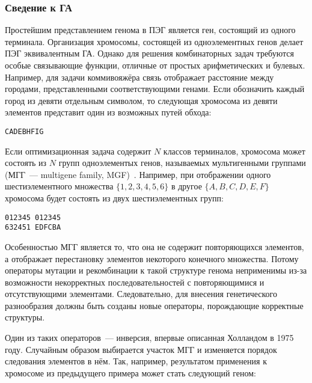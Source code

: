 
\subsubsection{Сведение к ГА}

Простейшим представлением генома в ПЭГ является ген, состоящий из одного терминала. Организация хромосомы, состоящей из одноэлементных генов делает ПЭГ эквивалентным ГА. Однако для решения комбинаторных задач требуются особые связывающие функции, отличные от простых арифметических и булевых. Например, для задачи коммивояжёра связь отображает расстояние между городами, представленными соответствующими генами. Если обозначить каждый город из девяти отдельным символом, то следующая хромосома из девяти элементов представит один из возможных путей обхода:

\begin{verbatim}
CADEBHFIG
\end{verbatim}

Если оптимизационная задача содержит $N$ классов терминалов, хромосома может состоять из $N$ групп одноэлементых генов, называемых мультигенными группами (МГГ~--- multigene family, MGF)~\cite{ferreira:2002:ASIA}. Например, при отображении одного шестиэлементного множества $\{1, 2, 3, 4, 5, 6\}$ в другое $\{A, B, C, D, E, F\}$ хромосома будет состоять из двух шестиэлементных групп:

\begin{samepage}
\begin{verbatim}
012345 012345
632451 EDFCBA
\end{verbatim}
\end{samepage}

Особенностью МГГ является то, что она не содержит повторяющихся элементов, а отображает перестановку элементов некоторого конечного множества. Потому операторы мутации и рекомбинации к такой структуре генома неприменимы из-за возможности некорректных последовательностей с повторяющимися и отсутствующими элементами. Следовательно, для внесения генетического разнообразия должны быть созданы новые операторы, порождающие корректные структуры.

Один из таких операторов~--- инверсия, впервые описанная Холландом в 1975 году. Случайным образом выбирается участок МГГ и изменяется порядок следования элементов в нём. Так, например, результатом применения к хромосоме из предыдущего примера может стать следующий геном:

